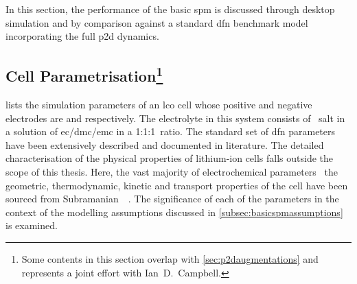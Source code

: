 
In this  section, the performance  of the  basic \gls{spm} is  discussed through
desktop  simulation and  by comparison  against a  standard \gls{dfn}  benchmark
model incorporating the full \gls{p2d} dynamics.


\subsection[Cell   Parametrisation]{Cell   Parametrisation\protect\footnote{Some
contents    in   this    section   overlap    with   \cref{sec:p2daugmentations}
and      represents     a      joint     effort      with     \mbox{Ian      D.\
Campbell}.}}\label{subsec:spmp2dparametrisation}



 lists  the simulation  parameters of  an \gls{lco}
cell  whose positive  and negative  electrodes are  \ch{LiCoO_2} and  \ch{LiC_6}
respectively.  The  electrolyte in  this  system  consists of  \ch{LiPF_6}~salt
in  a   solution  of   \gls{ec}/\gls{dmc}/\gls{emc}  in   a  1:1:1~ratio.  The
standard  set  of  \gls{dfn}  parameters have  been  extensively  described  and
documented  in  literature.  The   detailed  characterisation  of  the  physical
properties  of  lithium-ion  cells  falls  outside the  scope  of  this  thesis.
Here,  the vast  majority of  electrochemical parameters  \viz~the  geometric,
thermodynamic, kinetic  and transport properties  of the cell have  been sourced
from  Subramanian~\etal{}~\cite{Subramanian2009}. The  significance  of each  of
the  parameters  in  the  context  of the  modelling  assumptions  discussed  in
\cref{subsec:basicspmassumptions} is examined.

